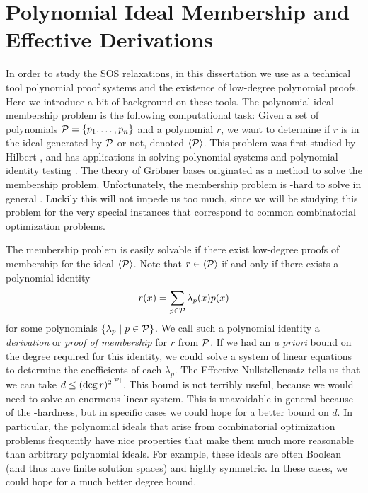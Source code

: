 \section{Polynomial Ideal Membership and Effective Derivations}

In order to study the SOS relaxations, in this dissertation we use as a technical tool polynomial proof systems and the existence of low-degree polynomial proofs.
Here we introduce a bit of background on these tools.
The polynomial ideal membership problem is the following computational task:
Given a set of polynomials $\mathcal P = \{p_1,\dots,p_n\}$ and a polynomial $r$, we want to determine if $r$ is in the ideal generated by $\mathcal P$ or not, denoted $\langle \mathcal P \rangle$.
This problem was first studied by Hilbert \cite{Hilbert1893}, and has applications in solving polynomial systems \cite{CLO07} and polynomial identity testing \cite{AM10}. 
The theory of Gr\"obner bases \cite{Buch65} originated as a method to solve the membership problem. 
Unfortunately, the membership problem is \expspace-hard to solve in general \cite{MM82,Huynh1985}.
Luckily this will not impede us too much, since we will be studying this problem for the very special instances that correspond to common combinatorial optimization problems.

The membership problem is easily solvable if there exist low-degree proofs of membership for the ideal $\langle \mathcal P \rangle$. 
Note that $r \in \langle \mathcal P \rangle$ if and only if there exists a polynomial identity
\[r(x) = \sum_{p \in \mathcal P} \lambda_p(x) p(x)\]
for some polynomials $\{\lambda_p \mid p \in \mathcal P\}$. We call such a polynomial identity a \emph{derivation} or \emph{proof of membership} for $r$ from $\mathcal P$.
If we had an \emph{a priori} bound on the degree required for this identity, we could solve a system of linear equations to determine the coefficients of each $\lambda_p$. The Effective Nullstellensatz \cite{Hermann1926} tells us that we can take $d \leq (\deg r)^{2^{|\mathcal P|}}$. This bound is not terribly useful, because we would need to solve an enormous linear system. This is unavoidable in general because of the \expspace-hardness, but in specific cases we could hope for a better bound on $d$. 
In particular, the polynomial ideals that arise from combinatorial optimization problems frequently have nice properties that make them much more reasonable than arbitrary polynomial ideals. For example, these ideals are often Boolean (and thus have finite solution spaces) and highly symmetric. In these cases, we could hope for a much better degree bound. 

